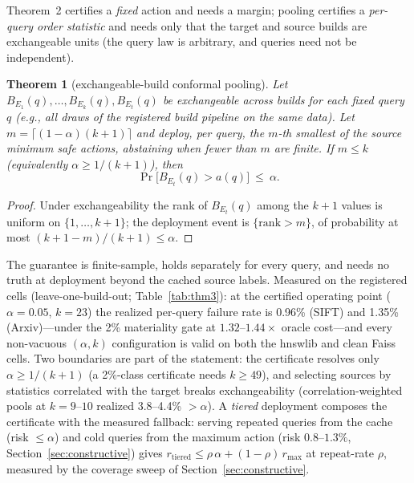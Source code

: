 \documentclass{article}
\newtheorem{theorem}{Theorem}
\renewcommand{\Pr}{\mathop{\mathrm{Pr}}}   %
\begin{document}
Theorem~2 certifies a \emph{fixed} action and needs a margin; pooling certifies a
\emph{per-query order statistic} and needs only that the target and source builds are
exchangeable units (the query law is arbitrary, and queries need not be independent).

\begin{theorem}[exchangeable-build conformal pooling]
Let $B_{E_1}(q),\dots,B_{E_k}(q),B_{E_t}(q)$ be exchangeable across builds for each
fixed query $q$ (e.g., all draws of the registered build pipeline on the same data).
Let $m=\lceil(1-\alpha)(k+1)\rceil$ and deploy, per query, the $m$-th smallest of the
source minimum safe actions, abstaining when fewer than $m$ are finite. If
$m\le k$ (equivalently $\alpha\ge 1/(k+1)$), then
\begin{equation}
\Pr\bigl[B_{E_t}(q)>a(q)\bigr]\ \le\ \alpha.
\label{eq:thm3}
\end{equation}
\end{theorem}

\begin{proof}
Under exchangeability the rank of $B_{E_t}(q)$ among the $k{+}1$ values is uniform on
$\{1,\dots,k{+}1\}$; the deployment event is $\{\mathrm{rank}>m\}$, of probability at
most $(k{+}1-m)/(k{+}1)\le\alpha$.
\end{proof}

The guarantee is finite-sample, holds separately for every query, and needs no truth at
deployment beyond the cached source labels. Measured on the registered cells
(leave-one-build-out; Table~\ref{tab:thm3}): at the certified operating point
($\alpha{=}0.05$, $k{=}23$) the realized per-query failure rate is 0.96\% (SIFT) and
1.35\% (Arxiv)---under the 2\% materiality gate at $1.32$--$1.44\times$ oracle
cost---and every non-vacuous $(\alpha,k)$ configuration is valid on both the hnswlib
and clean Faiss cells. Two boundaries are part of the statement: the certificate
resolves only $\alpha\ge 1/(k+1)$ (a 2\%-class certificate needs $k\ge 49$), and
selecting sources by statistics correlated with the target breaks exchangeability
(correlation-weighted pools at $k{=}9$--$10$ realized 3.8--4.4\% $>\alpha$).
A \emph{tiered} deployment composes the certificate with the measured fallback: serving
repeated queries from the cache (risk $\le\alpha$) and cold queries from the maximum
action (risk $0.8$--$1.3\%$, Section~\ref{sec:constructive}) gives
$r_{\mathrm{tiered}}\le\rho\,\alpha+(1-\rho)\,r_{\max}$ at repeat-rate $\rho$,
measured by the coverage sweep of Section~\ref{sec:constructive}.
\end{document}
